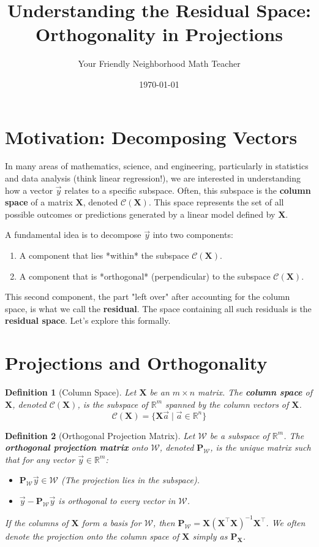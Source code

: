 \documentclass[11pt]{article}
\title{Understanding the Residual Space: Orthogonality in Projections}
\author{Your Friendly Neighborhood Math Teacher}
\date{\today}
\newcommand{\mat}[1]{\mathbf{#1}} %
\newcommand{\vecspace}[1]{\mathcal{#1}} %
\newcommand{\colspace}[1]{\vecspace{C}(#1)} %
\newcommand{\transpose}[1]{#1^{\top}} %
\newcommand{\proj}[1]{\mat{P}_{#1}} %
\newcommand{\realnums}{\mathbb{R}} %
\newtheorem{definition}{Definition}
\begin{document}
\maketitle

\section{Motivation: Decomposing Vectors}

In many areas of mathematics, science, and engineering, particularly in statistics and data analysis (think linear regression!), we are interested in understanding how a vector $\vec{y}$ relates to a specific subspace. Often, this subspace is the \textbf{column space} of a matrix $\mat{X}$, denoted $\colspace{\mat{X}}$. This space represents the set of all possible outcomes or predictions generated by a linear model defined by $\mat{X}$.

A fundamental idea is to decompose $\vec{y}$ into two components:
\begin{enumerate}
    \item A component that lies *within* the subspace $\colspace{\mat{X}}$.
    \item A component that is *orthogonal* (perpendicular) to the subspace $\colspace{\mat{X}}$.
\end{enumerate}
This second component, the part "left over" after accounting for the column space, is what we call the \textbf{residual}. The space containing all such residuals is the \textbf{residual space}. Let's explore this formally.

\section{Projections and Orthogonality}

\begin{definition}[Column Space]
Let $\mat{X}$ be an $m \times n$ matrix. The \textbf{column space} of $\mat{X}$, denoted $\colspace{\mat{X}}$, is the subspace of $\realnums^m$ spanned by the column vectors of $\mat{X}$.
\[ \colspace{\mat{X}} = \{ \mat{X}\vec{a} \mid \vec{a} \in \realnums^n \} \]
\end{definition}

\begin{definition}[Orthogonal Projection Matrix]
Let $\vecspace{W}$ be a subspace of $\realnums^m$. The \textbf{orthogonal projection matrix} onto $\vecspace{W}$, denoted $\proj{\vecspace{W}}$, is the unique matrix such that for any vector $\vec{y} \in \realnums^m$:
\begin{itemize}
    \item $\proj{\vecspace{W}}\vec{y} \in \vecspace{W}$ (The projection lies in the subspace).
    \item $\vec{y} - \proj{\vecspace{W}}\vec{y}$ is orthogonal to every vector in $\vecspace{W}$.
\end{itemize}
If the columns of $\mat{X}$ form a basis for $\vecspace{W}$, then $\proj{\vecspace{W}} = \mat{X}(\transpose{\mat{X}}\mat{X})^{-1}\transpose{\mat{X}}$. We often denote the projection onto the column space of $\mat{X}$ simply as $\proj{\mat{X}}$.
\end{definition}
\end{document}
